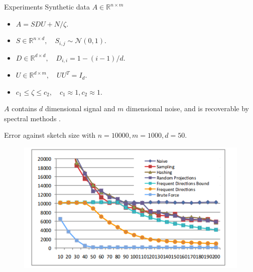 \documentclass[first=dgreen,second=purple,logo=redque]{aaltoslides}
\begin{document}
\begin{frame}[allowframebreaks=1]{Experiments}
Synthetic data $A \in \mathbb{R}^{n\times m}$
\begin{itemize}
  \item $A = SDU + N/\zeta$.
  \item $S \in \mathbb{R}^{n\times d},\quad S_{i,j} \sim \mathcal{N}(0,1)$.
  \item $D \in \mathbb{R}^{d\times d},\quad D_{i,i} = 1 - (i-1)/d$.
  \item $U \in \mathbb{R}^{d\times m}, \quad UU^T=I_d$.
  \item $c_1 \leq \zeta \leq c_2, \quad c_1 \approx 1,c_2 \approx 1$.
\end{itemize}
$A$ contains $d$ dimensional signal and $m$ dimensional noise, and is recoverable by spectral methods \cite{Vershynin11}.


\framebreak
Error against sketch size with $n=10000, m=1000, d=50$.
\begin{figure}
  \includegraphics[scale=0.6]{plots/acc}
 \label{fig:fp}
\end{figure}


\end{frame}
\end{document}

